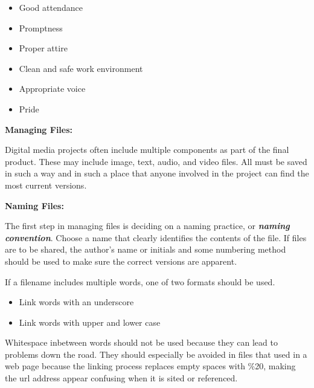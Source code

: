 \documentclass{report}
\begin{document}
    \bigbreak \noindent 
    \begin{itemize}
        \item Good attendance
        \item Promptness
        \item Proper attire
        \item Clean and safe work environment
        \item Appropriate voice
        \item Pride
    \end{itemize}


    \pagebreak
    \begin{Large}
       \noindent \textbf{Managing Files:} 
    \end{Large}
    
    \bigbreak \noindent 
    Digital media projects often include multiple components as part of the final product.
    These may include image, text, audio, and video files. All must be saved in such a way and in such a place that 
    anyone involved in the project can find the most current versions. 
    
    \bigbreak \noindent 
    \begin{Large}
        \textbf{Naming Files:}
    \end{Large}

    \bigbreak \noindent 
    The first step in managing files is deciding on a naming practice, or \textbf{ \textit{naming convention}}.
    Choose a name that clearly identifies the contents of the file. If files are to be shared, 
    the author's name or initials and some numbering method should be used to make 
    sure the correct versions are apparent.

    \bigbreak \noindent 
    If a filename includes multiple words, one of two formats should be used.

    \bigbreak \noindent 
    \begin{itemize}
        \item Link words with an underscore
        \item Link words with upper and lower case 
    \end{itemize}

    \bigbreak \noindent 
    Whitespace inbetween words should not be used because they can lead to problems down
    the road. They should especially be avoided in files that used in a web page because 
    the linking process replaces empty spaces with \%20, making the url address appear confusing when
    it is sited or referenced. 
\end{document}
